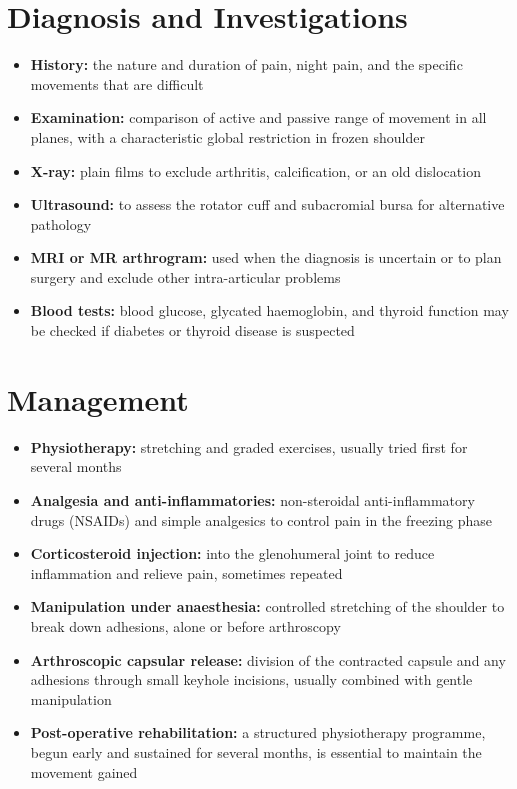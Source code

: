 \section*{Diagnosis and Investigations}
\begin{itemize}
    \item \textbf{History:} the nature and duration of pain, night pain, and the specific movements that are difficult
    \item \textbf{Examination:} comparison of active and passive range of movement in all planes, with a characteristic global restriction in frozen shoulder
    \item \textbf{X-ray:} plain films to exclude arthritis, calcification, or an old dislocation
    \item \textbf{Ultrasound:} to assess the rotator cuff and subacromial bursa for alternative pathology
    \item \textbf{MRI or MR arthrogram:} used when the diagnosis is uncertain or to plan surgery and exclude other intra-articular problems
    \item \textbf{Blood tests:} blood glucose, glycated haemoglobin, and thyroid function may be checked if diabetes or thyroid disease is suspected
\end{itemize}

\section*{Management}
\begin{itemize}
    \item \textbf{Physiotherapy:} stretching and graded exercises, usually tried first for several months
    \item \textbf{Analgesia and anti-inflammatories:} non-steroidal anti-inflammatory drugs (NSAIDs) and simple analgesics to control pain in the freezing phase
    \item \textbf{Corticosteroid injection:} into the glenohumeral joint to reduce inflammation and relieve pain, sometimes repeated
    \item \textbf{Manipulation under anaesthesia:} controlled stretching of the shoulder to break down adhesions, alone or before arthroscopy
    \item \textbf{Arthroscopic capsular release:} division of the contracted capsule and any adhesions through small keyhole incisions, usually combined with gentle manipulation
    \item \textbf{Post-operative rehabilitation:} a structured physiotherapy programme, begun early and sustained for several months, is essential to maintain the movement gained
\end{itemize}

